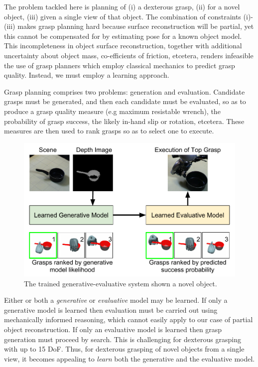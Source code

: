 The problem tackled here is planning of (i) a dexterous grasp, (ii) for a novel object, (iii) given a single view of that object. The combination of constraints (i)-(iii) makes grasp planning hard because surface reconstruction will be partial, yet this cannot be compensated for by estimating pose for a known object model. This incompleteness in object surface reconstruction, together with additional uncertainty about object mass, co-efficients of friction, etcetera, renders infeasible the use of grasp planners which employ classical mechanics to predict grasp quality. Instead, we must employ a learning approach.

Grasp planning comprises two problems: generation and evaluation. Candidate grasps must be generated, and then each candidate must be evaluated, so as to produce a grasp quality measure (e.g maximum resistable wrench), the probability of grasp success, the likely in-hand slip or rotation, etcetera. These measures are then used to rank grasps so as to select one to execute.
\begin{figure}[t]
\begin{center}
  \includegraphics[width=0.9\columnwidth]{images/contribution.pdf}
  \end{center}
  \caption{The trained generative-evaluative system shown a novel object.}
\label{fig:systemArchitecture}
\end{figure}
Either or both a {\em generative} or {\em evaluative} model may be learned. If only a generative model is learned then evaluation must be carried out using mechanically informed reasoning, which cannot easily apply to our case of partial object reconstruction. If only an evaluative model is learned then grasp generation must proceed by search. This is challenging for dexterous grasping with up to 15 DoF. Thus, for dexterous grasping of novel objects from a single view, it becomes appealing to {\em learn} both the generative and the evaluative model. 

